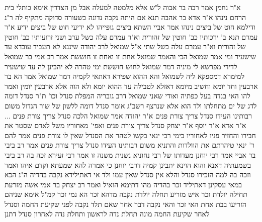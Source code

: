 \documentclass[12pt, openany]{book}
\begin{document}
{א"ר נחמן אמר רבה בר אבוה ל"ש אלא מלמטה למעלה אבל מן הצדדין אימא כותלי בית הרחם נינהו 
א"ר אדא בר אהבה תנא אם היתה נקבה נדונה כשעורה סדוקה מתקיף לה ר"נ ודילמא חוט של ביצים נינהו אמר אביי השתא ביצים גופייהו לא ידיעי חוט של ביצים ידיע 
א"ר עמרם תנא ב' ירכותיו כב' חוטין של זהורית וא"ר עמרם עלה כשל ערב ושני זרועותיו כב' חוטין של זהורית וא"ר עמרם עלה כשל שתי 
א"ל שמואל לרב יהודה שיננא לא תעביד עובדא עד שישעיר ומי אמר שמואל הכי והאמר שמואל אחת זו ואחת זו חוששת 
אמר רב אמי בר שמואל לדידי מפרשא לי מיניה דמר שמואל לחוש חוששת ימי טהרה לא יהבינן לה עד שישעיר 
למימרא דמספקא ליה לשמואל והא ההוא שפירא דאתאי לקמיה דמר שמואל אמר הא בר ארבעין וחד יומא וחשיב מיומא דאזלא לטבילה עד ההוא יומא ולא הוה אלא ארבעין יומין
ואמר להו האי בנדה בעל כפתיה ואודי שאני שמואל דרב גובריה
המפלת סנדל וכו' ת"ר סנדל דומה לדג של ים מתחלתו ולד הוא אלא שנרצף רשב"ג אומר סנדל דומה ללשון של שור הגדול משום רבותינו העידו סנדל צריך צורת פנים 
א"ר יהודה אמר שמואל הלכה סנדל צריך צורת פנים ... א"ר אדא א"ר יוסף א"ר יצחק סנדל צריך צורת פנים ואפי' מאחוריו משל לאדם שסטר את חבירו והחזיר פניו לאחוריו 
בימי רבי ינאי בקשו לטהר את הסנדל שאין לו צורת פנים אמר להם ר' ינאי טיהרתם את הוולדות 
והתניא משום רבותינו העידו סנדל צריך צורת פנים אמר רב ביבי בר אביי אמר רבי יוחנן מעדותו של רבי נחוניא נשנית משנה זו אמר רבי זעירא זכה בה רב ביבי בשמעתיה דאנא והוא הוינא יתבינן קמיה דרבי יוחנן כי אמרה להא שמעתא וקדם איהו ואמר וזכה בה 
למה הזכירו סנדל והלא אין סנדל שאין עמו ולד 
אי דאתילידא נקבה בהדיה ה"נ הכא במאי עסקינן דאתיליד זכר בהדיה 
מהו דתימא הואיל ואמר רב יצחק בר אמי אשה מזרעת תחילה יולדת זכר איש מזריע תחלה יולדת נקבה מדהא זכר הא נמי זכר
קמ"ל אימא שניהם הזריעו בבת אחת האי זכר והאי נקבה 
דבר אחר שאם תלד נקבה לפני שקיעת החמה וסנדל לאחר שקיעת החמה
מונה תחלת נדה לראשון ותחלת נדה לאחרון 
סנדל דתנן}
\end{document}
